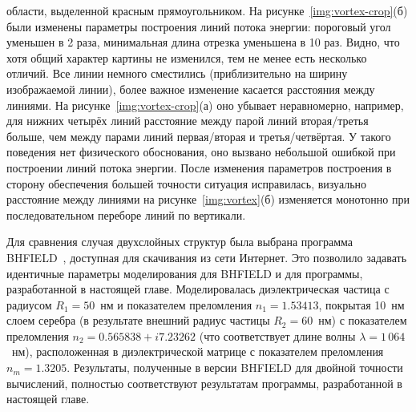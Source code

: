 области, выделенной красным прямоугольником. На
рисунке~\ref{img:vortex-crop}(б) были изменены параметры построения
линий потока энергии: пороговый угол уменьшен в 2 раза, минимальная
длина отрезка уменьшена в 10 раз. Видно, что хотя общий характер
картины не изменился, тем не менее есть несколько отличий. Все линии
немного сместились (приблизительно на ширину изображаемой линии), 
более важное изменение касается расстояния между линиями. На
рисунке~\ref{img:vortex-crop}(а) оно убывает неравномерно, например,
для нижних четырёх линий расстояние между парой линий вторая/третья
больше, чем между парами линий первая/вторая и третья/четвёртая. У
такого поведения нет физического обоснования, оно вызвано небольшой
ошибкой при построении линий потока энергии.  После изменения
параметров построения в сторону обеспечения большей точности ситуация
исправилась, визуально расстояние между линиями на рисунке~\ref{img:vortex}(б)
изменяется монотонно при последовательном переборе линий по вертикали. 
 
Для сравнения случая двухслойных структур была выбрана программа
BHFIELD~\cite{Suzuki-2008,Suzuki-2013}, доступная для скачивания из
сети Интернет.  Это позволило задавать идентичные параметры
моделирования для BHFIELD и для программы, разработанной в настоящей
главе. Моделировалась диэлектрическая частица с радиусом $R_1=50$~нм и
показателем преломления $n_1=1.53413$, покрытая 10~нм слоем серебра (в
результате внешний радиус частицы $R_2=60$~нм) с показателем
преломления $n_2=0.565838+i7.23262$ (что соответствует длине волны
$\lambda = 1\,064$~нм), расположенная в диэлектрической матрице с показателем
преломления $n_m=1.3205$.  Результаты, полученные в версии BHFIELD для
двойной точности вычислений, полностью соответствуют результатам
программы, разработанной в настоящей главе.

